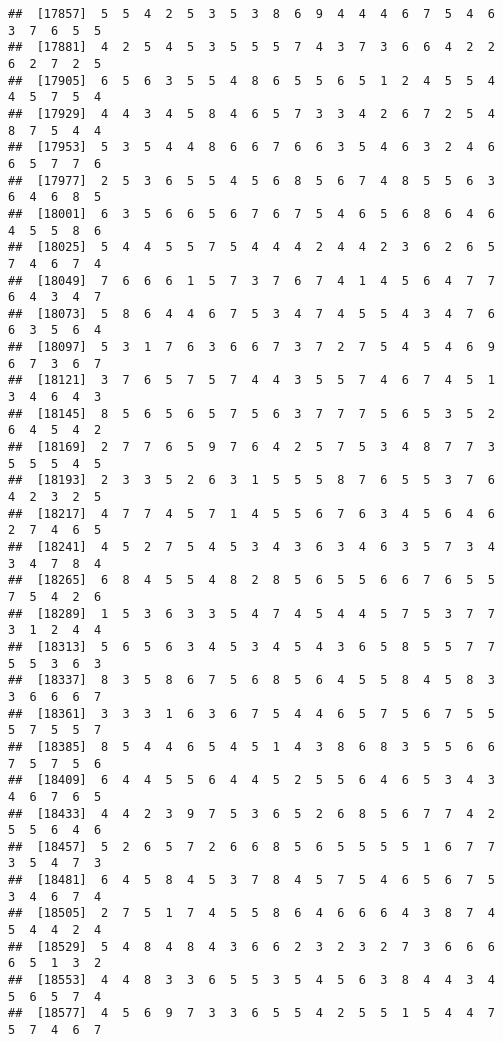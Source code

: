 \documentclass[
]{book}
\begin{document}
\begin{verbatim}
##  [17857]  5  5  4  2  5  3  5  3  8  6  9  4  4  4  6  7  5  4  6  3  7  6  5  5
##  [17881]  4  2  5  4  5  3  5  5  5  7  4  3  7  3  6  6  4  2  2  6  2  7  2  5
##  [17905]  6  5  6  3  5  5  4  8  6  5  5  6  5  1  2  4  5  5  4  4  5  7  5  4
##  [17929]  4  4  3  4  5  8  4  6  5  7  3  3  4  2  6  7  2  5  4  8  7  5  4  4
##  [17953]  5  3  5  4  4  8  6  6  7  6  6  3  5  4  6  3  2  4  6  6  5  7  7  6
##  [17977]  2  5  3  6  5  5  4  5  6  8  5  6  7  4  8  5  5  6  3  6  4  6  8  5
##  [18001]  6  3  5  6  6  5  6  7  6  7  5  4  6  5  6  8  6  4  6  4  5  5  8  6
##  [18025]  5  4  4  5  5  7  5  4  4  4  2  4  4  2  3  6  2  6  5  7  4  6  7  4
##  [18049]  7  6  6  6  1  5  7  3  7  6  7  4  1  4  5  6  4  7  7  6  4  3  4  7
##  [18073]  5  8  6  4  4  6  7  5  3  4  7  4  5  5  4  3  4  7  6  6  3  5  6  4
##  [18097]  5  3  1  7  6  3  6  6  7  3  7  2  7  5  4  5  4  6  9  6  7  3  6  7
##  [18121]  3  7  6  5  7  5  7  4  4  3  5  5  7  4  6  7  4  5  1  3  4  6  4  3
##  [18145]  8  5  6  5  6  5  7  5  6  3  7  7  7  5  6  5  3  5  2  6  4  5  4  2
##  [18169]  2  7  7  6  5  9  7  6  4  2  5  7  5  3  4  8  7  7  3  5  5  5  4  5
##  [18193]  2  3  3  5  2  6  3  1  5  5  5  8  7  6  5  5  3  7  6  4  2  3  2  5
##  [18217]  4  7  7  4  5  7  1  4  5  5  6  7  6  3  4  5  6  4  6  2  7  4  6  5
##  [18241]  4  5  2  7  5  4  5  3  4  3  6  3  4  6  3  5  7  3  4  3  4  7  8  4
##  [18265]  6  8  4  5  5  4  8  2  8  5  6  5  5  6  6  7  6  5  5  7  5  4  2  6
##  [18289]  1  5  3  6  3  3  5  4  7  4  5  4  4  5  7  5  3  7  7  3  1  2  4  4
##  [18313]  5  6  5  6  3  4  5  3  4  5  4  3  6  5  8  5  5  7  7  5  5  3  6  3
##  [18337]  8  3  5  8  6  7  5  6  8  5  6  4  5  5  8  4  5  8  3  3  6  6  6  7
##  [18361]  3  3  3  1  6  3  6  7  5  4  4  6  5  7  5  6  7  5  5  5  7  5  5  7
##  [18385]  8  5  4  4  6  5  4  5  1  4  3  8  6  8  3  5  5  6  6  7  5  7  5  6
##  [18409]  6  4  4  5  5  6  4  4  5  2  5  5  6  4  6  5  3  4  3  4  6  7  6  5
##  [18433]  4  4  2  3  9  7  5  3  6  5  2  6  8  5  6  7  7  4  2  5  5  6  4  6
##  [18457]  5  2  6  5  7  2  6  6  8  5  6  5  5  5  5  1  6  7  7  3  5  4  7  3
##  [18481]  6  4  5  8  4  5  3  7  8  4  5  7  5  4  6  5  6  7  5  3  4  6  7  4
##  [18505]  2  7  5  1  7  4  5  5  8  6  4  6  6  6  4  3  8  7  4  5  4  4  2  4
##  [18529]  5  4  8  4  8  4  3  6  6  2  3  2  3  2  7  3  6  6  6  6  5  1  3  2
##  [18553]  4  4  8  3  3  6  5  5  3  5  4  5  6  3  8  4  4  3  4  5  6  5  7  4
##  [18577]  4  5  6  9  7  3  3  6  5  5  4  2  5  5  1  5  4  4  7  5  7  4  6  7

\end{verbatim}
\end{document}
